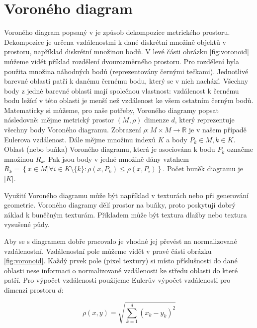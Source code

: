 
\section{Voroného diagram}\label{sec:voronoid}
Voroného diagram popsaný v \cite{VORONOID} je způsob dekompozice metrického prostoru.
Dekompozice je určena vzdálenostmi k dané diskrétní množině objektů v prostoru, například diskrétní množinou bodů.
V levé části obrázku \ref{fig:voronoid} můžeme vidět příklad rozdělení dvourozměrného prostoru.
Pro rozdělení byla použita množina náhodných bodů (reprezentovány černými tečkami).
Jednotlivé barevné oblasti patří k danému černému bodu, který se v nich nachází.
Všechny body z jedné barevné oblasti mají společnou vlastnost: vzdálenost k černému bodu ležící v této oblasti je menší než vzdálenost ke všem ostatním černým bodů.
Matematicky si můžeme, pro naše potřeby, Voroného diagramy popsat následovně: mějme metrický prostor $(M,\rho)$ dimenze $d$, který reprezentuje všechny body Voroného diagramu.
Zobrazení $ \rho: M \times M \to \mathbb{R} $ je v našem případě Eulerova vzdálenost.
Dále mějme množinu indexů $K$ a body $P_k \in M, k \in K$.
Oblast (nebo buňka) Voroného diagramu, která je asociována k bodu $P_k$ označme množinou $R_k$.
Pak jsou body v jedné množině dány vztahem $R_k=\left\{ x \in M | \forall i \in K \setminus \{k\}: \rho(x,P_k) \leq \rho(x,P_i) \right\}$.
Počet buněk diagramu je $|K|$.

Využití Voroného diagramu může být například v texturách nebo při generování geometrie.
Voroného diagramy dělí prostor na buňky, proto poskytují dobrý základ k buněčným texturám.
Příkladem může být textura dlažby nebo textura vysušené půdy.

Aby se s diagramem dobře pracovalo je vhodné jej převést na normalizované vzdálenostní.
Vzdálenostní pole můžeme vidět v pravé části obrázku \ref{fig:voronoid}.
Každý prvek pole (pixel textury) si místo příslušnosti do dané oblasti nese informaci o normalizované vzdálenosti ke středu oblasti do které patří.
Pro výpočet vzdálenosti použijeme Eulerův výpočet vzdálenosti pro dimenzi prostoru $d$:

\begin{equation}
\label{eq:eulerovavzdalenost}
\rho(x,y)=\sqrt{\sum_{k=1}^{d}(x_k-y_k)^2}
\end{equation}


